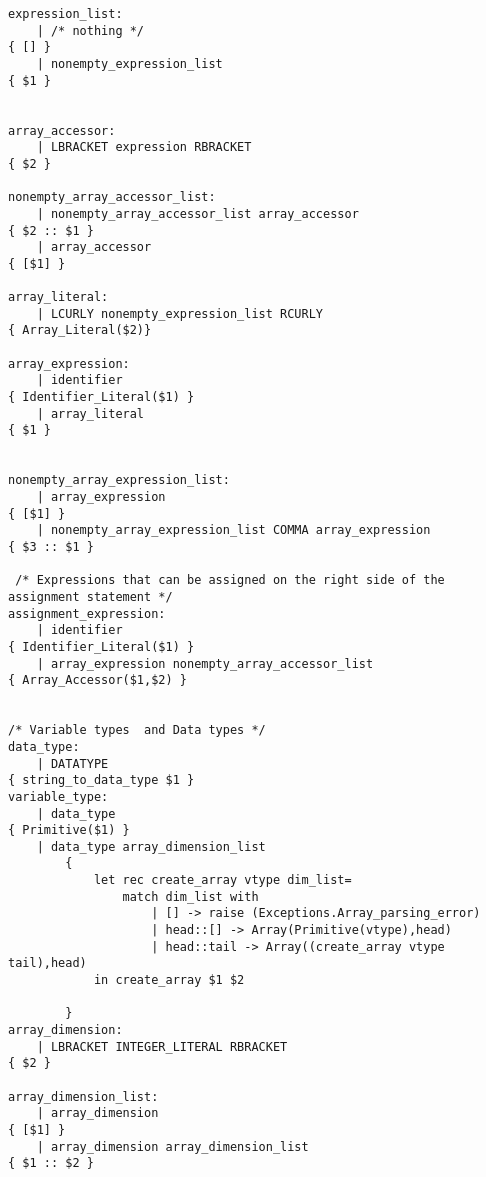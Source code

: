 \begin{verbatim}
expression_list:
    | /* nothing */                                                     { [] }   
    | nonempty_expression_list                                          { $1 }


array_accessor:
    | LBRACKET expression RBRACKET                                      { $2 }

nonempty_array_accessor_list:
    | nonempty_array_accessor_list array_accessor                       { $2 :: $1 }
    | array_accessor                                                    { [$1] } 

array_literal:
    | LCURLY nonempty_expression_list RCURLY                            { Array_Literal($2)}

array_expression:
    | identifier                                                        { Identifier_Literal($1) }
    | array_literal                                                     { $1 }


nonempty_array_expression_list:
    | array_expression                                                  { [$1] }
    | nonempty_array_expression_list COMMA array_expression             { $3 :: $1 }

 /* Expressions that can be assigned on the right side of the assignment statement */
assignment_expression:
    | identifier                                                        { Identifier_Literal($1) }
    | array_expression nonempty_array_accessor_list                     { Array_Accessor($1,$2) }


/* Variable types  and Data types */
data_type:
    | DATATYPE                                                          { string_to_data_type $1 }
variable_type:
    | data_type                                                         { Primitive($1) }
    | data_type array_dimension_list                            
        { 
            let rec create_array vtype dim_list= 
                match dim_list with
                    | [] -> raise (Exceptions.Array_parsing_error)
                    | head::[] -> Array(Primitive(vtype),head)
                    | head::tail -> Array((create_array vtype tail),head)
            in create_array $1 $2
             
        }
array_dimension:
    | LBRACKET INTEGER_LITERAL RBRACKET                                 { $2 }

array_dimension_list:
    | array_dimension                                                   { [$1] }
    | array_dimension array_dimension_list                              { $1 :: $2 }

\end{verbatim}	
